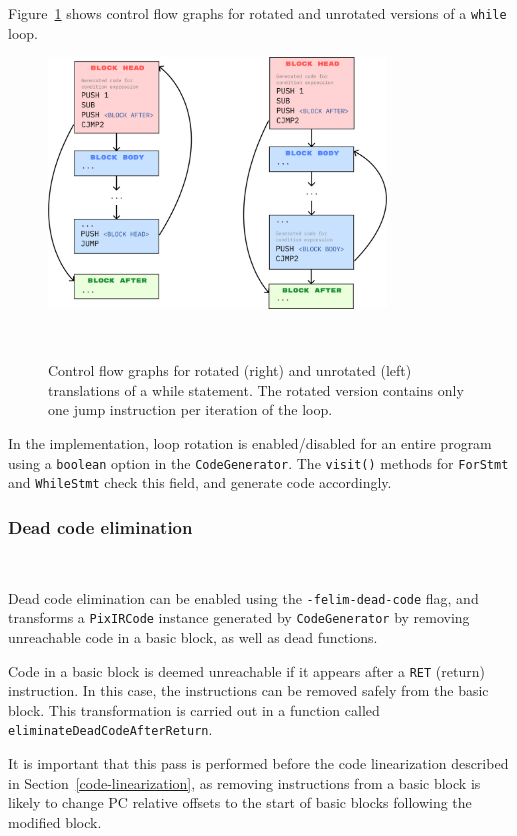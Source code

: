 \documentclass[11pt,a4paper]{scrartcl}
\begin{document}
Figure~\ref{fig:loop-rotation} shows control flow graphs for rotated and unrotated versions of a \verb|while| loop.

\begin{figure}
  \centering
  \includegraphics[width=0.8\textwidth]{loop_rotation}
  \caption{Control flow graphs for rotated (right) and unrotated (left) translations of a while statement. The rotated version contains only one jump instruction per iteration of the loop.}~\label{fig:loop-rotation}
\end{figure}

In the implementation, loop rotation is enabled/disabled for an entire program using a \verb|boolean| option in the \verb|CodeGenerator|. The \verb|visit()| methods for \verb|ForStmt| and \verb|WhileStmt| check this field, and generate code accordingly.

\subsubsection{Dead code elimination}~\label{sec:deadcode}

Dead code elimination can be enabled using the \verb|-felim-dead-code| flag, and transforms a \verb|PixIRCode| instance generated by \verb|CodeGenerator| by removing unreachable code in a basic block, as well as dead functions.

Code in a basic block is deemed unreachable if it appears after a \verb|RET| (return) instruction. In this case, the instructions can be removed safely from the basic block. This transformation is carried out in a function called \verb|eliminateDeadCodeAfterReturn|.

It is important that this pass is performed before the code linearization described in Section~\ref{code-linearization}, as removing instructions from a basic block is likely to change PC relative offsets to the start of basic blocks following the modified block.
\end{document}
